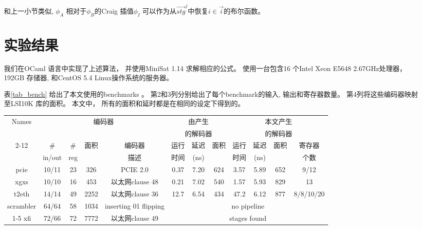 和上一小节类似,
$\phi_A$ 相对于$\phi_B$的Craig 插值$\phi_I$
可以作为从$\vec{stg}^j$中恢复$i\in\vec{i}$的布尔函数。



\section{实验结果}\label{sec_exp}
我们在OCaml 语言中实现了上述算法，
并使用MiniSat 1.14 \cite{EXTSAT}求解相应的公式。
使用一台包含16 个Intel Xeon E5648 2.67GHz处理器，
192GB 存储器, 和CentOS 5.4 Linux操作系统的服务器。

表\ref{tab_bench} 给出了本文使用的benchmarks 。
第2和3列分别给出了每个benchmark的输入, 输出和寄存器数量。
第4列将这些编码器映射至LSI10K 库的面积。
本文中，
所有的面积和延时都是在相同的设定下得到的。



\begin{table*}[t]
\caption{Benchmarks and experimental results}
\begin{tabular}{|c|c|c|c|c|c|c|c|c|c|c|c|}
\hline
 Names     & \multicolumn{4}{|c|}{编码器}                                  &   \multicolumn{3}{|c|}{由\cite{ShenTCAD11}产生}             &   \multicolumn{4}{|c|}{本文产生} \\
           & \multicolumn{4}{|c|}{}                                              &   \multicolumn{3}{|c|}{的解码器}  &   \multicolumn{4}{|c|}{的解码器} \\\cline{2-12}
           &    \#   &   \#    &面积& 编码器&运行&延迟&面积                                       &运行&延迟&面积&寄存器\\
           & in/out  &  reg    &      &   描述&时间&(ns) &                                        &时间 &(ns) &    &个数\\\hline\hline
 pcie      & 10/11   & 23      & 326  &PCIE 2.0 \cite{pcie21}                    &0.37 &7.20 &624                                     &3.57 & 5.89&652 &9/12\\\hline
 xgxs      & 10/10   & 16      & 453  &     以太网clause 48 \cite{IEEE8023_S4}&0.21 &7.02 &540                                     &1.57 & 5.93&829 &13\\\hline
 t2eth     & 14/14   & 49      & 2252 &    以太网clause 36 \cite{IEEE8023_S4} &12.7 &6.54 &434                                     &47.2 & 6.12&877 &8/8/10/20\\\hline
scrambler  &64/64    & 58      & 1034 & inserting 01 flipping                    &     \multicolumn{7}{|c|}{no pipeline }\\\cline{1-5}
 xfi       & 72/66   & 72      & 7772 &     以太网clause 49 \cite{IEEE8023_S4}&     \multicolumn{7}{|c|}{stages found}\\\hline
\end{tabular}\label{tab_bench}
\end{table*}





